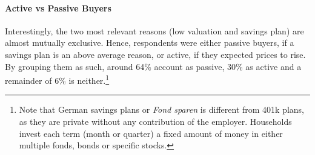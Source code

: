 \documentclass[ProjectABM]{subfiles}
\begin{document}




\paragraph{Active vs Passive Buyers}
Interestingly, the two most relevant reasons (low valuation and savings plan) are almost mutually exclusive. Hence, respondents were either passive buyers, if a savings plan is an above average reason, or active, if they expected prices to rise. By grouping them as such, around 64\% account as passive, 30\% as active and a remainder of 6\% is neither.\footnote{Note that German savings plans or \textit{Fond sparen} is different from 401k plans, as they are private without any contribution of the employer. Households invest each term (month or quarter) a fixed amount of money in either multiple fonds, bonds or specific stocks.}

\end{document}
